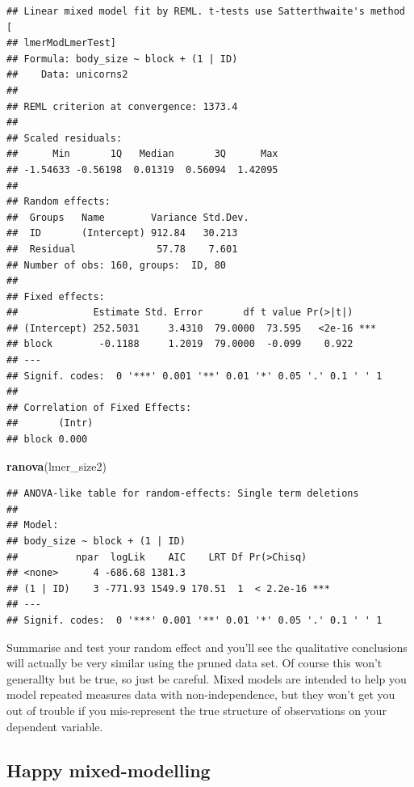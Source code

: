 \documentclass[
  12pt,
]{book}
\newenvironment{Shaded}{\begin{snugshade}}{\end{snugshade}}
\newcommand{\KeywordTok}[1]{\textcolor[rgb]{0.13,0.29,0.53}{\textbf{#1}}}
\newcommand{\NormalTok}[1]{#1}
\begin{document}
\begin{verbatim}
## Linear mixed model fit by REML. t-tests use Satterthwaite's method [
## lmerModLmerTest]
## Formula: body_size ~ block + (1 | ID)
##    Data: unicorns2
## 
## REML criterion at convergence: 1373.4
## 
## Scaled residuals: 
##      Min       1Q   Median       3Q      Max 
## -1.54633 -0.56198  0.01319  0.56094  1.42095 
## 
## Random effects:
##  Groups   Name        Variance Std.Dev.
##  ID       (Intercept) 912.84   30.213  
##  Residual              57.78    7.601  
## Number of obs: 160, groups:  ID, 80
## 
## Fixed effects:
##             Estimate Std. Error       df t value Pr(>|t|)    
## (Intercept) 252.5031     3.4310  79.0000  73.595   <2e-16 ***
## block        -0.1188     1.2019  79.0000  -0.099    0.922    
## ---
## Signif. codes:  0 '***' 0.001 '**' 0.01 '*' 0.05 '.' 0.1 ' ' 1
## 
## Correlation of Fixed Effects:
##       (Intr)
## block 0.000
\end{verbatim}

\begin{Shaded}
\begin{Highlighting}[]
\KeywordTok{ranova}\NormalTok{(lmer\_size2)}
\end{Highlighting}
\end{Shaded}

\begin{verbatim}
## ANOVA-like table for random-effects: Single term deletions
## 
## Model:
## body_size ~ block + (1 | ID)
##          npar  logLik    AIC    LRT Df Pr(>Chisq)    
## <none>      4 -686.68 1381.3                         
## (1 | ID)    3 -771.93 1549.9 170.51  1  < 2.2e-16 ***
## ---
## Signif. codes:  0 '***' 0.001 '**' 0.01 '*' 0.05 '.' 0.1 ' ' 1
\end{verbatim}

Summarise and test your random effect and you'll see the qualitative conclusions will actually be very similar using the pruned data set. Of course this won't generallty but be true, so just be careful. Mixed models are intended to help you model repeated measures data with non-independence, but they won't get you out of trouble if you mis-represent the true structure of observations on your dependent variable.

\hypertarget{happy-mixed-modelling}{%
\subsection{Happy mixed-modelling}\label{happy-mixed-modelling}}
\end{document}
